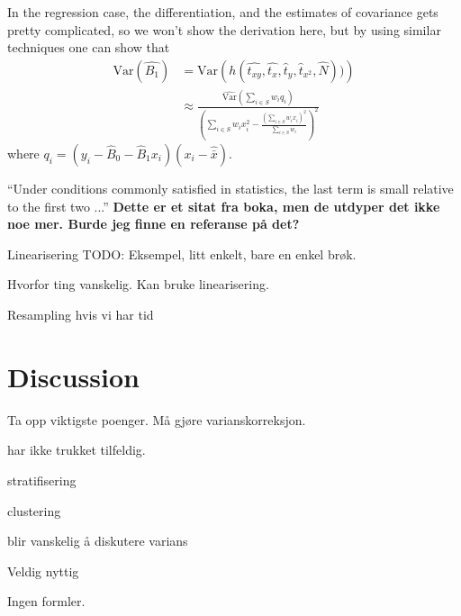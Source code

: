 \documentclass{article}
\begin{document}
In the regression case, the differentiation, and the estimates of covariance
gets pretty complicated, so we won't show the derivation here, but by using
similar techniques one can show that
\begin{align*}
 \mathrm{Var}(\hat{B_1})
 &= \mathrm{Var} \left( h(\hat{t_{xy}}, \hat{t_x},
 \hat{t}_y, \hat{t}_{x^2}, \hat{N})) \right) \\
 &\approx \frac{\widehat{\mathrm{Var}}\left( \sum_{i \in S} w_i q_i \right)}
   {\left( \sum_{i \in S} w_i x_i^2 - \frac{\left( \sum_{i \in S} w_i x_i \right)^2}{\sum_{i \in S} w_i} \right)^2}
\end{align*}
where \(q_i = (y_i - \hat{B}_0 - \hat{B}_1 x_i)(x_i - \hat{\bar{x}})\).

``Under conditions commonly satisfied in statistics, the last term is small
relative to the first two ...'' \textbf{Dette er et sitat fra boka, men de
  utdyper det ikke noe mer. Burde jeg finne en referanse på det?}


Linearisering
TODO: Eksempel, litt enkelt, bare en enkel brøk.

Hvorfor ting vanskelig.
Kan bruke linearisering.

Resampling hvis vi har tid

\section{Discussion}
Ta opp viktigste poenger.
Må gjøre varianskorreksjon.

har ikke trukket tilfeldig.

stratifisering

clustering

blir vanskelig å diskutere varians

Veldig nyttig

Ingen formler.
\end{document}
